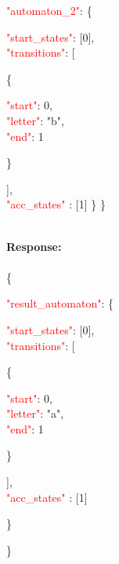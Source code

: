    \begin{adjustwidth}{7.5 mm}{0 cm}

   \textcolor{red}{"automaton\_2"}: \{
     \begin{adjustwidth}{7.5 mm}{0 cm}
            \textcolor{red}{"start\_states"}: [0],\\
            \textcolor{red}{"transitions"}: [
            \begin{adjustwidth}{7.5 mm}{0 cm}
            \{
               \begin{adjustwidth}{7.5 mm}{0 cm}
                    \textcolor{red}{"start"}: 0,\\
                    \textcolor{red}{"letter"}: "b",\\
                    \textcolor{red}{"end"}: 1
               \end{adjustwidth}
            \}
            \end{adjustwidth}
            ],\\
        \textcolor{red}{"acc\_states" }: [1]  \} \}
    \end{adjustwidth}
\end{adjustwidth}
\ \\
\textbf{Response:}\\
\ \\
 \{
 \begin{adjustwidth}{7.5 mm}{0 cm}
    \textcolor{red}{"result\_automaton"}: \{
        \begin{adjustwidth}{7.5 mm}{0 cm}
            \textcolor{red}{"start\_states"}: [0],\\
            \textcolor{red}{"transitions"}: [
            \begin{adjustwidth}{7.5 mm}{0 cm}
            \{
               \begin{adjustwidth}{7.5 mm}{0 cm}
                    \textcolor{red}{"start"}: 0,\\
                    \textcolor{red}{"letter"}: "a",\\
                    \textcolor{red}{"end"}: 1
               \end{adjustwidth}
            \}
            \end{adjustwidth}
            ],\\
        \textcolor{red}{"acc\_states" }: [1]
    \end{adjustwidth}
    \}
\end{adjustwidth}
\}


